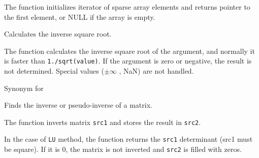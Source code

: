 
\begin{description}
\end{description}

The function initializes iterator of
sparse array elements and returns pointer to the first element, or NULL
if the array is empty.

\fi

Calculates the inverse square root.


\begin{description}
\end{description}


The function calculates the inverse square root of the argument, and normally it is faster than \texttt{1./sqrt(value)}. If the argument is zero or negative, the result is not determined. Special values ($\pm \infty $ , NaN) are not handled.


Synonym for 

Finds the inverse or pseudo-inverse of a matrix.


\begin{description}
\end{description}

The function inverts matrix \texttt{src1} and stores the result in \texttt{src2}.

In the case of \texttt{LU} method, the function returns the \texttt{src1} determinant (src1 must be square). If it is 0, the matrix is not inverted and \texttt{src2} is filled with zeros.

